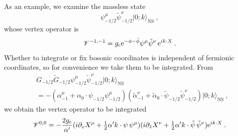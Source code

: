 As an example, we examine the massless state
\begin{equation}
	\psi_{-1/2}^{\mu}\tilde{\psi}_{-1/2}^{\nu} \lvert 0;k\rangle_{\text{NS}} \:, \label{12.3.41}
\end{equation}
whose vertex operator is
\begin{equation}
	\mathscr{V}^{{-}1,{-}1} = g_{\mathrm{c}}\mathrm{e}^{-\phi-\tilde{\phi}}\psi^{\mu}\tilde{\psi}^{\nu}\,\mathrm{e}^{i k\cdot X}\:. \label{12.3.42}
\end{equation}
Whether to integrate or fix bosonic coordinates is independent of fermionic coordinates, so for convenience we take them to be integrated. From
\begin{align}
	& G_{{-}1/2}\tilde{G}_{{-}1/2}\psi_{-1/2}^{\mu}\tilde{\psi}_{-1/2}^{\nu} \lvert 0;k\rangle_{\text{NS}} \nonumber\\
	&={-}(\alpha_{-1}^{\mu}+\alpha_{0}\cdot \psi_{-1/2}\psi_{-1/2}^{\mu})
	(\tilde{\alpha}^{\nu}_{-1}+\tilde{\alpha}_{0}\cdot \tilde{\psi}_{-1/2}\tilde{\psi}_{-1/2}^{\nu})\lvert 0;k\rangle_{\text{NS}} \:, \label{12.3.43}
\end{align}
we obtain the vertex operator to be integrated
\begin{equation}
	\mathscr{V}^{0,0} = -\frac{2g_{\mathrm{c}}}{\alpha^{\prime}}(i\partial_{z}X^{\mu}+
	\tfrac{1}{2}\alpha^{\prime}k\cdot \psi\,\psi^{\mu})(i\partial_{\bar{z}}X^{\nu}
	+\tfrac{1}{2}\alpha^{\prime}k\cdot\tilde{\psi}\,\tilde{\psi}^{\nu}) \mathrm{e}^{i k\cdot X} \:. \label{12.3.44}
\end{equation}
